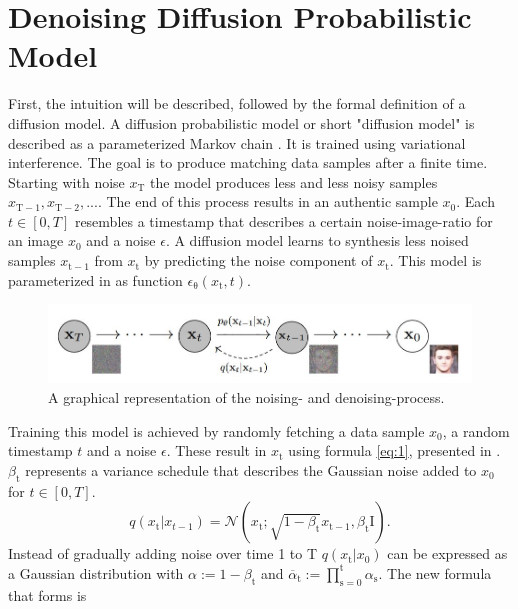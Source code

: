 \section{Denoising Diffusion Probabilistic Model}
\label{sec:ddpm}
First, the intuition will be described, followed by the formal definition of a diffusion model. A diffusion probabilistic model or short "diffusion model" is described as a parameterized Markov chain \cite{ho_denoising_2020}. It is trained using variational interference. The goal is to produce matching data samples after a finite time. Starting with noise $x_\mathrm{T}$ the model produces less and less noisy samples $x_\mathrm{T-1} , x_\mathrm{T-2} , ...$. The end of this process results in an authentic sample $x_\mathrm{0}$. Each $t \in [0,T]$ resembles a timestamp that describes a certain noise-image-ratio for an image $x_\mathrm{0}$ and a noise $\epsilon$.  A diffusion model learns to synthesis less noised samples $x_\mathrm{t-1}$ from $x_\mathrm{t}$ by predicting the noise component of $x_\mathrm{t}$. This model is parameterized in \cite{ho_denoising_2020} as function $\epsilon_\mathrm{\theta}(x_\mathrm{t}, t)$.
\begin{figure}
    \centering
    \includegraphics[width=\textwidth]{images/ddpm.JPG}
    \caption{A graphical representation of the noising- and denoising-process.}
    \label{fig:ddpm}
\end{figure}
Training this model is achieved by randomly fetching a data sample $x_\mathrm{0}$, a random timestamp $t$ and a noise $\epsilon$. \newline These result in $x_\mathrm{t}$ using formula \ref{eq:1}, presented in \cite{ho_denoising_2020}. $\beta_\mathrm{t}$ represents a variance schedule that describes the Gaussian noise added to $x_\mathrm{0}$ for $t \in [0,T]$.
\begin{equation}
\label{eq:1}
    q(x_\mathrm{t}|x_{t-1}) = \mathcal{N}(x_\mathrm{t};\sqrt{1-\beta_\mathrm{t}}x_\mathrm{t-1},\beta_\mathrm{t}\mathrm{I}).
\end{equation}
Instead of gradually adding noise over time 1 to T $q(x_\mathrm{t}|x_0)$ can be expressed as a Gaussian distribution with $\alpha:= 1-\beta_\mathrm{t}$ and $\overline{\alpha}_\mathrm{t} := \prod_\mathrm{s=0}^\mathrm{t} \alpha_\mathrm{s}$. The new formula that forms is

